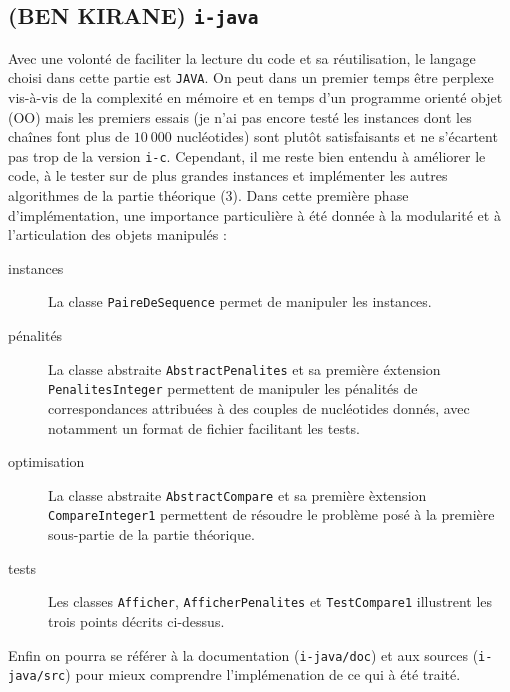 \subsection{(BEN KIRANE) \texttt{i-java}}
Avec une volont\'e de faciliter la lecture du code et sa
r\'eutilisation, le langage choisi dans cette partie est
\texttt{JAVA}. On peut dans un premier temps \^etre perplexe
vis-\`a-vis de la complexit\'e en m\'emoire et en temps d'un programme
orient\'e objet (OO) mais les premiers essais (je n'ai pas encore
test\'e les instances dont les cha\^ines font plus de $10\ 000$
nucl\'eotides) sont plut\^ot satisfaisants et ne s'\'ecartent pas trop
de la version \verb'i-c'. Cependant, il me reste bien entendu \`a
am\'eliorer le code, \`a le tester sur de plus grandes instances et
impl\'ementer les autres algorithmes de la partie th\'eorique (3).
\pagebreak Dans cette premi\`ere phase d'impl\'ementation, une
importance particuli\`ere \`a \'et\'e donn\'ee \`a la modularit\'e et
\`a l'articulation des objets manipul\'es :
\begin{description}
\item[instances] La classe \verb'PaireDeSequence' permet de manipuler
  les instances.
\item[p\'enalit\'es] La classe abstraite \verb'AbstractPenalites' et
  sa premi\`ere \'extension \verb'PenalitesInteger' permettent de
  manipuler les p\'enalit\'es de correspondances attribu\'ees \`a des
  couples de nucl\'eotides donn\'es, avec notamment un format de
  fichier facilitant les tests.
\item[optimisation] La classe abstraite \verb'AbstractCompare' et sa
  premi\`ere \`extension \verb'CompareInteger1' permettent de
  r\'esoudre le probl\`eme pos\'e \`a la premi\`ere sous-partie de la
  partie th\'eorique.
\item[tests] Les classes \verb'Afficher', \verb'AfficherPenalites' et
  \verb'TestCompare1' illustrent les trois points d\'ecrits ci-dessus.
\end{description}
Enfin on pourra se r\'ef\'erer \`a la documentation
(\verb'i-java/doc') et aux sources (\verb'i-java/src') pour mieux
comprendre l'impl\'emenation de ce qui \`a \'et\'e trait\'e.
